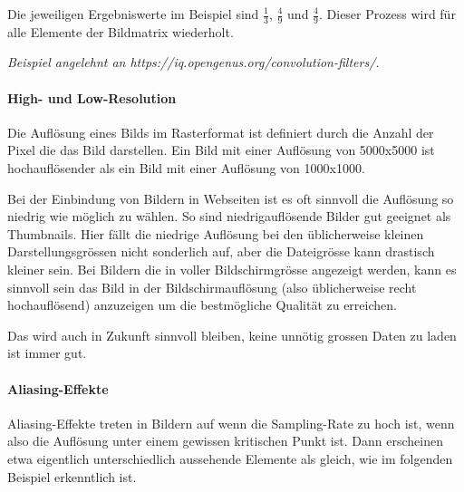 \documentclass{article}
\begin{document}
Die jeweiligen Ergebniswerte im Beispiel sind $\frac{1}{3}$, $\frac{4}{9}$ und $\frac{4}{9}$. Dieser Prozess wird f\"ur alle Elemente der Bildmatrix wiederholt.

\emph{Beispiel angelehnt an https://iq.opengenus.org/convolution-filters/.}

\paragraph{High- und Low-Resolution}

Die Aufl\"osung eines Bilds im Rasterformat ist definiert durch die Anzahl der Pixel die das Bild darstellen. Ein Bild mit einer Aufl\"osung von 5000x5000 ist hochaufl\"osender als ein Bild mit einer Aufl\"osung von 1000x1000.

Bei der Einbindung von Bildern in Webseiten ist es oft sinnvoll die Aufl\"osung so niedrig wie m\"oglich zu w\"ahlen. So sind niedrigaufl\"osende Bilder gut geeignet als Thumbnails. Hier f\"allt die niedrige Aufl\"osung bei den \"ublicherweise kleinen Darstellungsgr\"ossen nicht sonderlich auf, aber die Dateigr\"osse kann drastisch kleiner sein. Bei Bildern die in voller Bildschirmgr\"osse angezeigt werden, kann es sinnvoll sein das Bild in der Bildschirmaufl\"osung (also \"ublicherweise recht hochaufl\"osend) anzuzeigen um die bestm\"ogliche Qualit\"at zu erreichen.

Das wird auch in Zukunft sinnvoll bleiben, keine unn\"otig grossen Daten zu laden ist immer gut.

\paragraph{Aliasing-Effekte}

Aliasing-Effekte treten in Bildern auf wenn die Sampling-Rate zu hoch ist, wenn also die Aufl\"osung unter einem gewissen kritischen Punkt ist. Dann erscheinen etwa eigentlich unterschiedlich aussehende Elemente als gleich, wie im folgenden Beispiel erkenntlich ist.
\end{document}
